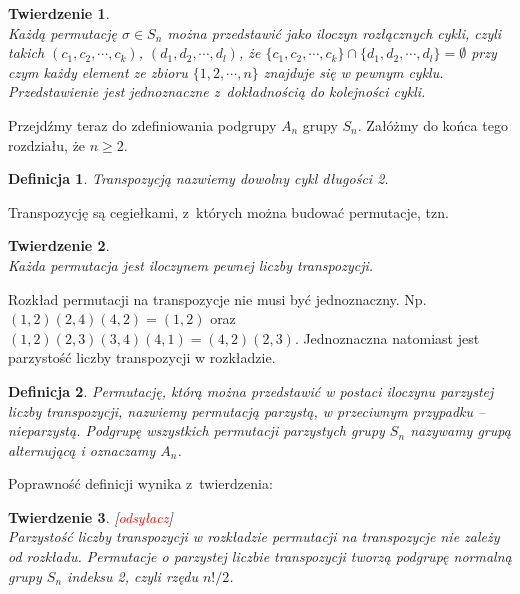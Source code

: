 \documentclass[licencjacka]{pracamgr}
\newtheorem{deff}{Definicja}[section]
\newtheorem{thh}{Twierdzenie}[section]
\begin{document}
\begin{thh} $ $ \\      %
    Każdą permutację $\sigma \in S_n$ można przedstawić jako iloczyn rozłącznych cykli,
    czyli takich $(c_1, c_2, \cdots, c_k)$, $(d_1, d_2, \cdots, d_l)$, że $\{ c_1, c_2, \cdots, c_k \} \cap \{ d_1, d_2, \cdots, d_l \} = \emptyset$
    przy czym każdy element ze zbioru $\{1, 2, \cdots, n\}$ znajduje się w pewnym cyklu.
    Przedstawienie jest jednoznaczne z~dokładnością do kolejności cykli.
\end{thh}

\pagebreak[2]

Przejdźmy teraz do zdefiniowania podgrupy $A_n$ grupy $S_n$. Załóżmy
do końca tego rozdziału, że $n \ge 2$.

\begin{deff}
    \emph{Transpozycją} nazwiemy dowolny cykl długości 2.
\end{deff}

Transpozycję są cegiełkami, z~których można budować permutacje, tzn.

\begin{thh} $ $ \\
    Każda permutacja jest iloczynem pewnej liczby transpozycji.
\end{thh}

Rozkład permutacji na transpozycje nie musi być jednoznaczny. Np.
$(1, 2) (2, 4) (4, 2) = (1, 2)$ oraz $(1, 2) (2, 3) (3, 4) (4, 1) =
(4, 2) (2, 3)$. Jednoznaczna natomiast jest parzystość liczby
transpozycji w rozkładzie.

\begin{deff}
    Permutację, którą można przedstawić w postaci iloczynu parzystej liczby
    transpozycji, nazwiemy \emph{permutacją parzystą},
    w przeciwnym przypadku -- \emph{nieparzystą}.
    Podgrupę wszystkich permutacji parzystych grupy $S_n$ nazywamy \emph{grupą alternującą} i oznaczamy $A_n$.
\end{deff}


Poprawność definicji wynika z~twierdzenia:

\begin{thh}\label{thm_A_n} $ $[\textcolor{red}{odsyłacz}] \\
    Parzystość liczby transpozycji w rozkładzie permutacji na transpozycje nie zależy od rozkładu.
    Permutacje o parzystej liczbie transpozycji tworzą podgrupę normalną grupy $S_n$ indeksu 2, czyli
    rzędu $n!/2$.
\end{thh}
\end{document}
